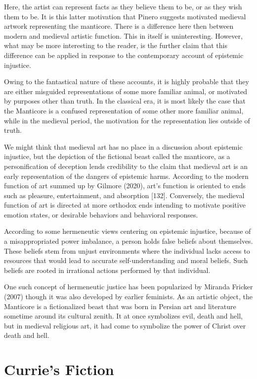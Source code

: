 \documentclass[
  letterpaper,
  DIV=11,
  numbers=noendperiod]{scrreprt}
\begin{document}
\begin{tcolorbox}[enhanced jigsaw, arc=.35mm, breakable, rightrule=.15mm, colback=white, colframe=quarto-callout-important-color-frame, bottomrule=.15mm, leftrule=.75mm, opacityback=0, toprule=.15mm, left=2mm]
\begin{tcolorbox}[enhanced jigsaw, arc=.35mm, breakable, rightrule=.15mm, colback=white, colframe=quarto-callout-tip-color-frame, bottomrule=.15mm, leftrule=.75mm, opacityback=0, toprule=.15mm, left=2mm]
Here, the artist can represent facts as they believe them to be, or as
they wish them to be. It is this latter motivation that Pinero suggests
motivated medieval artwork representing the manticore. There is a
difference here then between modern and medieval artistic function. This
in itself is uninteresting. However, what may be more interesting to the
reader, is the further claim that this difference can be applied in
response to the contemporary account of epistemic injustice.

Owing to the fantastical nature of these accounts, it is highly probable
that they are either misguided representations of some more familiar
animal, or motivated by purposes other than truth. In the classical era,
it is most likely the case that the Manticore is a confused
representation of some other more familiar animal, while in the medieval
period, the motivation for the representation lies outside of truth.

We might think that medieval art has no place in a discussion about
epistemic injustice, but the depiction of the fictional beast called the
manticore, as a personification of deception lends credibility to the
claim that medieval art is an early representation of the dangers of
epistemic harms. According to the modern function of art summed up by
Gilmore (2020), art's function is oriented to ends such as pleasure,
entertainment, and absorption {[}132{]}. Conversely, the medieval
function of art is directed at more orthodox ends intending to motivate
positive emotion states, or desirable behaviors and behavioral
responses.

According to some hermeneutic views centering on epistemic injustice,
because of a misappropriated power imbalance, a person holds false
beliefs about themselves. These beliefs stem from unjust environments
where the individual lacks access to resources that would lead to
accurate self-understanding and moral beliefs. Such beliefs are rooted
in irrational actions performed by that individual.

One such concept of hermeneutic justice has been popularized by Miranda
Fricker (2007) though it was also developed by earlier feminists. As an
artistic object, the Manticore is a fictionalized beast that was born in
Persian art and literature sometime around its cultural zenith. It at
once symbolizes evil, death and hell, but in medieval religious art, it
had come to symbolize the power of Christ over death and hell.

\chapter{Currie's Fiction}\label{curries-fiction}


\end{tcolorbox}
\end{tcolorbox}
\end{document}
